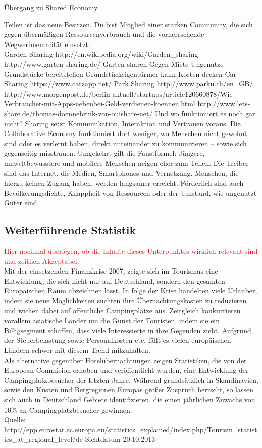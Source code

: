 Übergang zu Shared Economy\\

{\color{blue}
Teilen ist das neue Besitzen. Du bist Mitglied einer starken Community, die sich gegen übermäßigen Ressourcenverbrauch und die vorherrschende Wegwerfmentalität einsetzt.\\

Garden Sharing
http://en.wikipedia.org/wiki/Garden\_sharing
http://www.garten-sharing.de/
Garten sharen
Gegen Miete
Ungenutze Grundstücke bereitstellen
Grundstückeigentürmer kann Kosten decken
Car Sharing
https://www.carzapp.net/
Park Sharing
http://www.parku.ch/en\_GB/
http://www.morgenpost.de/berlin-aktuell/startups/article120660878/Wie-Verbraucher-mit-Apps-nebenbei-Geld-verdienen-koennen.html
http://www.lets-share.de/thomas-doennebrink-von-ouishare-net/
Und wo funktioniert es noch gar nicht? Sharing setzt Kommunikation, Interaktion und Vertrauen voraus. Die Collaborative Economy funktioniert dort weniger, wo Menschen nicht gewohnt sind oder es verlernt haben, direkt miteinander zu kommunizieren – sowie sich gegenseitig misstrauen.  Umgekehrt gilt die Faustformel: Jüngere, umweltbewusstere und mobilere Menschen neigen eher zum Teilen. Die Treiber sind das Internet, die Medien, Smartphones und Vernetzung. Menschen, die hierzu keinen Zugang haben, werden langsamer erreicht. Förderlich sind auch Bevölkerungsdichte, Knappheit von Ressourcen oder der Umstand, wie ungenutzt Güter sind.

}



\newpage
\subsection{Weiterführende Statistik}
\textcolor{red}{Hier nochmal überlegen, ob die Inhalte dieses Unterpunktes wirklich relevant sind und zeitlich Akzeptabel.}\\


Mit der einsetzenden Finanzkrise 2007, zeigte sich im Tourismus eine Entwicklung, die sich nicht nur auf Deutschland, sondern den gesamten Europäischen Raum abzeichnen lässt. 
In folge der Krise handelten viele Urlauber, indem sie neue Möglichkeiten suchten ihre Übernachtungskosten zu reduzieren und wichen dabei auf öffentliche Campingplätze aus. 
Zeitgleich konkurrieren vorallem asiatische Länder um die Gunst der Touristen, indem sie ein Billigsegment schaffen, dass viele Interessierte in ihre Gegenden zieht. Aufgrund der Steuerbelastung sowie Personalkosten etc. fällt es vielen europäischen Ländern schwer mit diesem Trend mitzuhalten.\\
Als alternative gegenüber Hotelübernachtungen zeigen Statistiken, die von der European Commision erhoben und veröffentlicht wurden, eine Entwicklung der Campingplatzbesucher der letzten Jahre.  Während grundsätzlich in Skandinavien, sowie den Küsten und Bergregionen Europas großer Zuspruch herrscht, so lassen sich auch in Deutschland Gebiete identifizieren, die einen jährlichen Zuwachs von 10\% an Campingplatzbesucher gewinnen.\\

Quelle: http://epp.eurostat.ec.europa.eu/statistics\_explained/index.php/Tourism\_statistics\_at\_regional\_level/de 
Sichtdatum 20.10.2013




